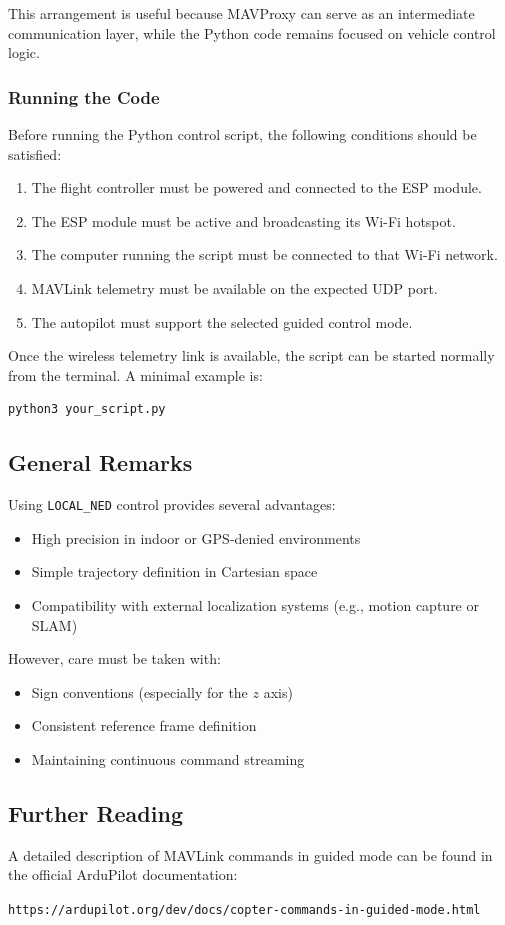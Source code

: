This arrangement is useful because MAVProxy can serve as an intermediate communication layer, while the Python code remains focused on vehicle control logic.
\subsubsection{Running the Code}

Before running the Python control script, the following conditions should be satisfied:

\begin{enumerate}
    \item The flight controller must be powered and connected to the ESP module.
    \item The ESP module must be active and broadcasting its Wi-Fi hotspot.
    \item The computer running the script must be connected to that Wi-Fi network.
    \item MAVLink telemetry must be available on the expected UDP port.
    \item The autopilot must support the selected guided control mode.
\end{enumerate}

Once the wireless telemetry link is available, the script can be started normally from the terminal. A minimal example is:

\begin{verbatim}
python3 your_script.py
\end{verbatim}

\subsection{General Remarks}

Using \texttt{LOCAL\_NED} control provides several advantages:

\begin{itemize}
    \item High precision in indoor or GPS-denied environments
    \item Simple trajectory definition in Cartesian space
    \item Compatibility with external localization systems (e.g., motion capture or SLAM)
\end{itemize}

However, care must be taken with:
\begin{itemize}
    \item Sign conventions (especially for the $z$ axis)
    \item Consistent reference frame definition
    \item Maintaining continuous command streaming
\end{itemize}

\subsection{Further Reading}

A detailed description of MAVLink commands in guided mode can be found in the official ArduPilot documentation:

\begin{center}
\texttt{https://ardupilot.org/dev/docs/copter-commands-in-guided-mode.html}
\end{center}

